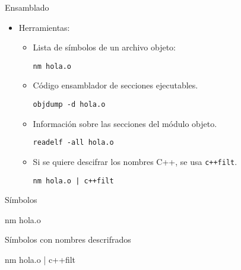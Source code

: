 \begin{frame}[fragile]{Ensamblado}
\begin{itemize}
\item \pause Herramientas:
  \begin{itemize}
    \item Lista de símbolos de un archivo objeto:
\begin{lstlisting}[style=terminal]
nm hola.o
\end{lstlisting}
    \item \pause Código ensamblador de secciones ejecutables.
\begin{lstlisting}[style=terminal]
objdump -d hola.o
\end{lstlisting}
    \item \pause Información sobre las secciones del módulo objeto.
\begin{lstlisting}[style=terminal]
readelf -all hola.o
\end{lstlisting}
    \item \pause Si se quiere descifrar los nombres C++, se usa \verb-c++filt-.
\begin{lstlisting}[style=terminal]
nm hola.o | c++filt
\end{lstlisting}
  \end{itemize}
\end{itemize}
\end{frame}

\begin{frame}{Símbolos}
\begin{block}{nm hola.o}

\end{block}
\end{frame}

\begin{frame}{Símbolos con nombres descrifrados}
\begin{block}{nm hola.o | c++filt}

\end{block}
\end{frame}


